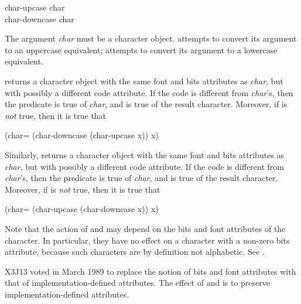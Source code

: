 \begin{defun}[Function]
char-upcase char \\
char-downcase char

The argument {\it char} must be a character object.
 attempts to convert its argument to an uppercase
equivalent;  attempts to convert its argument
to a lowercase equivalent.

\begin{obsolete}
 returns a character object with the same font
and bits attributes as {\it char}, but with possibly a different code
attribute.  If the code is different from {\it char}'s, then the predicate
 is true of {\it char}, and 
is true of the result character.  Moreover, if 
is {\it not} true, then it is true that
\begin{lisp}
(char= (char-downcase (char-upcase x)) x)
\end{lisp}
Similarly,
 returns a character object with the same font
and bits attributes as {\it char}, but with possibly a different code
attribute.  If the code is different from {\it char}'s, then the predicate
 is true of {\it char}, and 
is true of the result character.  Moreover, if 
is {\it not} true, then it is true that
\begin{lisp}
(char= (char-upcase (char-downcase x)) x)
\end{lisp}
Note that the action of  and  may
depend on the bits and font attributes of the character.  In particular,
they have no effect on a character with a non-zero bits attribute,
because such characters are by definition not alphabetic.
See .
\end{obsolete}

\begin{newer}
X3J13 voted in March 1989 
to replace the notion of bits and font attributes with
that of implementation-defined attributes.  The effect of
 and  is to preserve
implementation-defined attributes.
\end{newer}

\end{defun}

